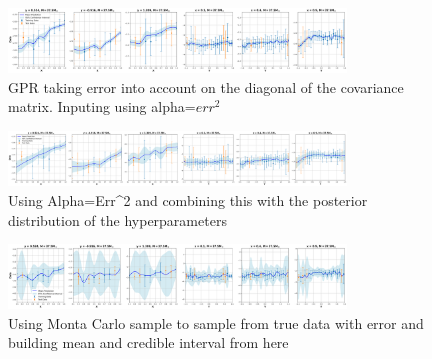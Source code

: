 \documentclass{article}
\begin{document}
\begin{figure}[H]  %
    \centering
    \includegraphics[width=0.8\textwidth]{GoodPlots/Alpha = Err^2.png}  %
    \caption{GPR taking error into account on the diagonal of the covariance matrix. Inputing using alpha=$err^2$}
    \label{fig:my_graph}
\end{figure}


\begin{figure}[H]  %
    \centering
    \includegraphics[width=0.8\textwidth]{GoodPlots/Posteriorwithparameterdistribution.png}  %
    \caption{Using Alpha=Err^2 and combining this with the posterior distribution of the hyperparameters}
    \label{fig:my_graph}
\end{figure}


\begin{figure}[H]  %
    \centering
    \includegraphics[width=0.8\textwidth]{GoodPlots/Monte Carlo Sampling.png}  %
    \caption{Using Monta Carlo sample to sample from true data with error and building mean and credible interval from here}
    \label{fig:my_graph}
\end{figure}
\end{document}
